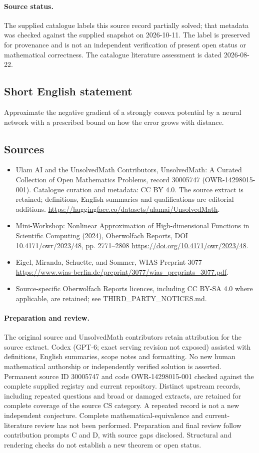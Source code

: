 \documentclass[11pt]{article}
\begin{document}
\paragraph{Source status.}
The supplied catalogue labels this source record partially solved; that metadata was checked against the supplied snapshot on 2026-10-11. The label is preserved for provenance and is not an independent verification of present open status or mathematical correctness. The catalogue literature assessment is dated 2026-08-22.
\subsection{Short English statement}
Approximate the negative gradient of a strongly convex potential by a neural network with a prescribed bound on how the error grows with distance.
\subsection{Sources}
\begin{itemize}
\item[\hypertarget{source:30005747:1}{S1}] Ulam AI and the UnsolvedMath Contributors, UnsolvedMath: A Curated Collection of Open Mathematics Problems, record 30005747 (OWR-14298015-001). Catalogue curation and metadata: CC BY 4.0. The source extract is retained; definitions, English summaries and qualifications are editorial additions.
\url{https://huggingface.co/datasets/ulamai/UnsolvedMath}.
\item[\hypertarget{source:30005747:2}{S2}] Mini-Workshop: Nonlinear Approximation of High-dimensional Functions in Scientific Computing (2024), Oberwolfach Reports, DOI 10.4171/owr/2023/48, pp. 2771--2808
\url{https://doi.org/10.4171/owr/2023/48}.
\item[\hypertarget{source:30005747:3}{S3}] Eigel, Miranda, Schuette, and Sommer, WIAS Preprint 3077
\url{https://www.wias-berlin.de/preprint/3077/wias_preprints_3077.pdf}.
\item Source-specific Oberwolfach Reports licences, including CC BY-SA 4.0 where applicable, are retained; see THIRD\_PARTY\_NOTICES.md.
\end{itemize}
\paragraph{Preparation and review.}
The original source and UnsolvedMath contributors retain attribution for the source extract. Codex (GPT-6; exact serving revision not exposed) assisted with definitions, English summaries, scope notes and formatting. No new human mathematical authorship or independently verified solution is asserted. Permanent source ID 30005747 and code OWR-14298015-001 checked against the complete supplied registry and current repository. Distinct upstream records, including repeated questions and broad or damaged extracts, are retained for complete coverage of the source CS category. A repeated record is not a new independent conjecture. Complete mathematical-equivalence and current-literature review has not been performed. Preparation and final review follow contribution prompts C and D, with source gaps disclosed. Structural and rendering checks do not establish a new theorem or open status.
\label{end:30005747}
\end{document}
